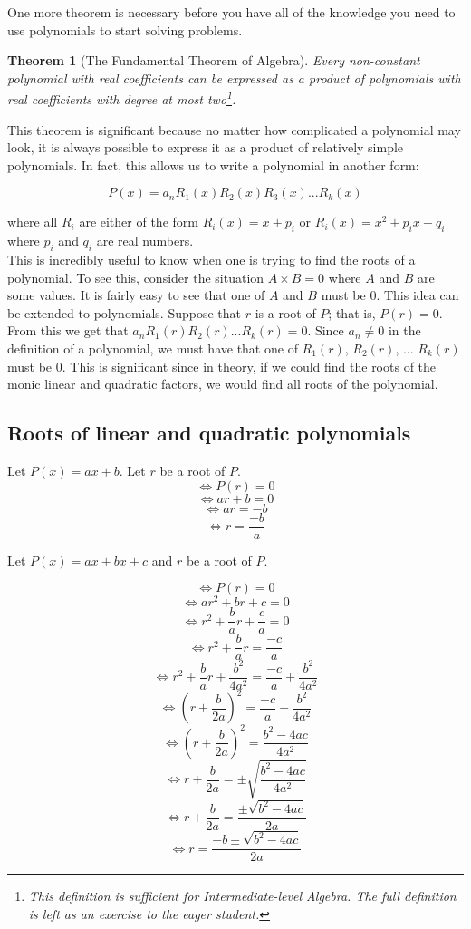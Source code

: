 \documentclass[a4paper,12pt]{article}
\newtheorem{theorem}{Theorem}[section]
\begin{document}
One more theorem is necessary before you have all of the knowledge you need to use polynomials to start solving problems. \\

\begin{theorem}[The Fundamental Theorem of Algebra] 
    Every non-constant polynomial with real coefficients can be expressed as a product of polynomials with real coefficients with degree at most two\footnote{This definition is sufficient for Intermediate-level Algebra. The full definition is left as an exercise to the eager student.}.
\end{theorem}

This theorem is significant because no matter how complicated a polynomial may look, it is always possible to express it as a product of relatively simple polynomials. In fact, this allows us to write a polynomial in another form:

$$P(x) = a_nR_1(x)R_2(x)R_3(x)...R_k(x)$$

where all $R_i$ are either of the form $R_i(x) = x + p_i$ or $R_i(x) = x^2 + p_ix + q_i$ where $p_i$ and $q_i$ are real numbers. \\

This is incredibly useful to know when one is trying to find the roots of a polynomial. To see this, consider the situation $A \times B = 0$ where $A$ and $B$ are some values. It is fairly easy to see that one of $A$ and $B$ must be $0$. This idea can be extended to polynomials. Suppose that $r$ is a root of $P$; that is, $P(r) = 0$. From this we get that $a_nR_1(r)R_2(r)...R_k(r) = 0$. Since $a_n \neq 0$ in the definition of a polynomial, we must have that one of $R_1(r)$, $R_2(r)$, ... $R_k(r)$ must be $0$. This is significant since in theory, if we could find the roots of the monic linear and quadratic factors, we would find all roots of the polynomial.

\subsection{Roots of linear and quadratic polynomials}
Let $P(x) = ax + b$. Let $r$ be a root of $P$.
$$\iff P(r) = 0$$
$$\iff ar + b = 0$$
$$\iff ar = -b$$
$$\iff r = \frac{-b}{a}$$

Let $P(x) = ax + bx + c$ and $r$ be a root of $P$.
 
$$\iff P(r) = 0$$
$$\iff ar^2 + br + c = 0$$
$$\iff r^2 + \frac{b}{a}r + \frac{c}{a} = 0$$
$$\iff r^2 + \frac{b}{a}r = \frac{-c}{a}$$
$$\iff r^2 + \frac{b}{a}r + \frac{b^2}{4a^2} = \frac{-c}{a} + \frac{b^2}{4a^2}$$
$$\iff (r + \frac{b}{2a})^2 = \frac{-c}{a} + \frac{b^2}{4a^2}$$
$$\iff (r + \frac{b}{2a})^2 = \frac{b^2 - 4ac}{4a^2}$$
$$\iff r + \frac{b}{2a} = \pm\sqrt{ \frac{b^2 - 4ac}{4a^2} }$$
$$\iff r + \frac{b}{2a} = \frac{\pm \sqrt{b^2 - 4ac}}{2a}$$
$$\iff r = \frac{-b \pm \sqrt{b^2 - 4ac}}{2a}$$
\end{document}
